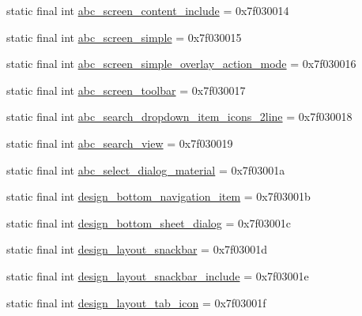\begin{CompactItemize}
\item 
static final int \hyperlink{classandroid_1_1support_1_1graphics_1_1drawable_1_1_r_1_1layout_b8153268dd00e925860d5b550a03d581}{abc\_\-screen\_\-content\_\-include} = 0x7f030014
\item 
static final int \hyperlink{classandroid_1_1support_1_1graphics_1_1drawable_1_1_r_1_1layout_89fbccb968f2b31527d1d60e4d8f33f3}{abc\_\-screen\_\-simple} = 0x7f030015
\item 
static final int \hyperlink{classandroid_1_1support_1_1graphics_1_1drawable_1_1_r_1_1layout_fcb2a1d18ddf0a30627cf572e5c460cd}{abc\_\-screen\_\-simple\_\-overlay\_\-action\_\-mode} = 0x7f030016
\item 
static final int \hyperlink{classandroid_1_1support_1_1graphics_1_1drawable_1_1_r_1_1layout_daa78a73543a295d7885f59b5b2b0498}{abc\_\-screen\_\-toolbar} = 0x7f030017
\item 
static final int \hyperlink{classandroid_1_1support_1_1graphics_1_1drawable_1_1_r_1_1layout_2662913398281ba4af7dd34f43c6ef53}{abc\_\-search\_\-dropdown\_\-item\_\-icons\_\-2line} = 0x7f030018
\item 
static final int \hyperlink{classandroid_1_1support_1_1graphics_1_1drawable_1_1_r_1_1layout_54a5df8c7e845ae6a1c16f1dd9a506cc}{abc\_\-search\_\-view} = 0x7f030019
\item 
static final int \hyperlink{classandroid_1_1support_1_1graphics_1_1drawable_1_1_r_1_1layout_4833fb5d1c445e4f9dc075a33f4eadf3}{abc\_\-select\_\-dialog\_\-material} = 0x7f03001a
\item 
static final int \hyperlink{classandroid_1_1support_1_1graphics_1_1drawable_1_1_r_1_1layout_b60b33096f1fe35563ba35f9b952423e}{design\_\-bottom\_\-navigation\_\-item} = 0x7f03001b
\item 
static final int \hyperlink{classandroid_1_1support_1_1graphics_1_1drawable_1_1_r_1_1layout_c8bfa39e7b2a53292c8e15941f04dab6}{design\_\-bottom\_\-sheet\_\-dialog} = 0x7f03001c
\item 
static final int \hyperlink{classandroid_1_1support_1_1graphics_1_1drawable_1_1_r_1_1layout_a5300112747f810f7b84d7b72283a77e}{design\_\-layout\_\-snackbar} = 0x7f03001d
\item 
static final int \hyperlink{classandroid_1_1support_1_1graphics_1_1drawable_1_1_r_1_1layout_6290c7325111ea8270102f79f7c778a7}{design\_\-layout\_\-snackbar\_\-include} = 0x7f03001e
\item 
static final int \hyperlink{classandroid_1_1support_1_1graphics_1_1drawable_1_1_r_1_1layout_1b9ff5ff08e28345279384436bf9557d}{design\_\-layout\_\-tab\_\-icon} = 0x7f03001f

\end{CompactItemize}
